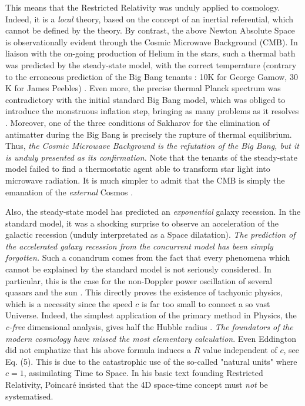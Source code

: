 \documentclass[a4paper,9pt]{article}
\newcounter{row}
\begin{document}
This means that the Restricted Relativity was unduly applied to cosmology. Indeed, it is a \textit{local} theory, based on the concept of an inertial referential, which cannot be defined by the theory. By contrast, the above Newton Absolute Space is observationally evident through the Cosmic Microwave Background (CMB). In liaison with the on-going production of Helium in the stars, such a thermal bath was predicted by the steady-state model, with the correct temperature (contrary to the erroneous prediction of the Big Bang tenants : 10K for George Gamow, 30 K for James Peebles) \cite{Hoyle2}. Even more, the precise thermal Planck spectrum was contradictory with the initial standard Big Bang model, which was obliged to introduce the monstruous inflation step, bringing as many problems as it resolves \cite{Steinhardt}. Moreover, one of the three conditions of Sakharov \cite{Sakharov} for the elimination of antimatter during the Big Bang is precisely the rupture of thermal equilibrium. Thus, \textit {the Cosmic Microwave Background is the refutation of the Big Bang, but it is unduly presented as its confirmation.} Note that the tenants of the steady-state model failed to find a thermostatic agent able to transform star light into microwave radiation. It is much simpler to admit that the CMB is simply the emanation of the \textit {external} Cosmos \cite{Sanchez2}. 

Also, the steady-state model has predicted an \textit{exponential} galaxy recession. In the standard model, it was a shocking surprise to observe an acceleration of the galactic recession (unduly interpretated as a Space dilatation). \textit{The prediction of the accelerated galaxy recession from the concurrent model has been simply forgotten.} Such a conandrum comes from the fact that every phenomena which cannot be explained by the standard model is not seriously considered. In particular, this is the case for the non-Doppler power oscillation of several quasars and the sun \cite{Kotov}. This directly proves the existence of tachyonic physics, which is a necessity since the speed $c$ is far too small to connect a so vast Universe. Indeed, the simplest application of the primary method in Physics, the \textit {c-free} dimensional analysis, gives half the Hubble radius \cite {Sanchez3}. \textit{The foundators of the modern cosmology have missed the most elementary calculation}. Even Eddington did not emphatize that his above formula induces a $R$ value independent of $c$, see Eq. (5). This is due to the catastrophic use of the so-called "natural units" where $c = 1$, assimilating Time to Space. In his basic text founding Restricted Relativity, Poincaré \cite{Poincare3} insisted that the 4D space-time concept must \textit{not} be systematised.  
\end{document}
